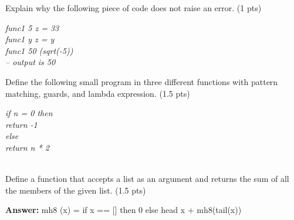 \documentclass [11pt, a4wide, twoside]{article}
\begin{document}
\begin{myitemize}

\item Explain why the following piece of code does not raise an error. (1 pts)

\emph{
func1 5 z = 33 \\
func1 y z = y \\
func1 50 (sqrt(-5)) \\
-- output is 50
}
\\



\item Define the following small program in three different functions with pattern matching,  guards, and lambda expression. (1.5 pts)

\emph{
if n = 0 then \\
return -1 \\
else \\ 
return n * 2 \\
}
\\

%
%




\item Define a function that accepts a list as an argument and returns the sum of all the members of the given list. (1.5 pts)

\textbf{Answer:}
mh8 (x) = if x == [] then 0 else head x + mh8(tail(x))


\newpage



\end{myitemize}
\end{document}
